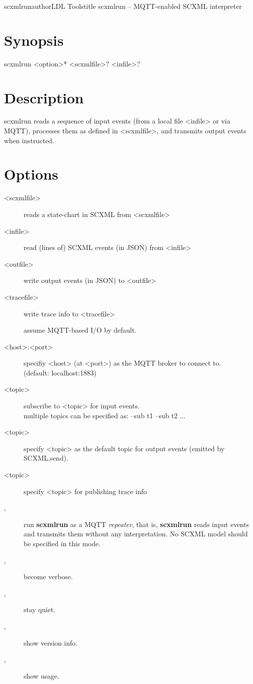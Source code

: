 \documentclass[fancy]{article}
\begin{document}
\begin{Name}{1}{scxmlrun}{author}{LDL Tools}{title}
scxmlrun -- MQTT-enabled SCXML interpreter
\end{Name}

\section{Synopsis}
scxmlrun <option>* <scxmlfile>? <infile>?

\section{Description}
scxmlrun reads
a sequence of input events (from a local file <infile> or via MQTT),
processes them as defined in <scxmlfile>,
and transmits output events when instructed.

\section{Options}
\begin{description}
%
\item[ <scxmlfile>]
  reads a state-chart in SCXML from <scxmlfile>

\item[ <infile>]
  read (lines of) SCXML events (in JSON) from <infile>
%
\item[ <outfile>]
  write output events (in JSON) to <outfile>
%
\item[ <tracefile>]
  write trace info to <tracefile>
%

\item[]
  assume MQTT-based I/O by default.
%
\item[ <host>\Lbr:<port>\Rbr]
  specifiy <host> (at <port>) as the MQTT broker to connect to.\\
  (default: localhost:1883)
%
\item[ <topic>]
  subscribe to <topic> for input events.\\
  multiple topics can be specified as: --sub t1 --sub t2 ...
%
\item[ <topic>]
  specify <topic> as the default topic for output events (emitted by SCXML.send).
%
\item[ <topic>]
  specify <topic> for publishing trace info

\item[, ]
  run \textbf{scxmlrun} as a MQTT \emph{repeater}, that is,
  \textbf{scxmlrun} reads input events and transmits them without any interpretation.
  No SCXML model should be specified in this mode.

\item[, ]
  become verbose.
%
\item[, ]
  stay quiet.
%
\item[, ]
  show version info.
%
\item[, ]
  show usage.

\end{description}
\end{document}
